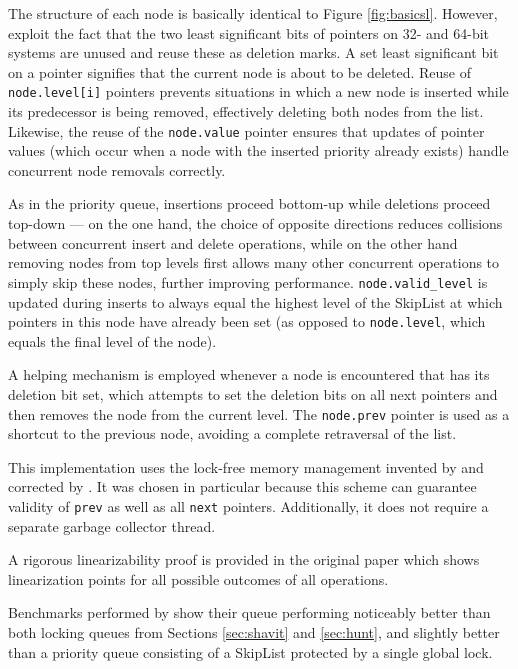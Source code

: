 The structure of each node is basically identical to Figure \ref{fig:basicsl}. However, \citeauthor{sundell2003fast}
exploit the fact that the two least significant bits of pointers on 32- and 64-bit systems
are unused and reuse these as deletion marks. A set least significant bit on a pointer signifies
that the current node is about to be deleted.
Reuse of \lstinline|node.level[i]| pointers
prevents situations in which a new node is inserted while its predecessor is being removed,
effectively deleting both nodes from the list. Likewise, the reuse of the \lstinline|node.value|
pointer ensures that updates of pointer values (which occur when a node with the inserted priority already exists)
handle concurrent node removals correctly.

As in the \citeauthor{shavit2000skiplist} priority queue, insertions proceed bottom-up while
deletions proceed top-down --- on the one hand, the choice of opposite directions reduces collisions
between concurrent insert and delete operations, while on the other hand removing nodes from top levels first
allows many other concurrent operations to simply skip these nodes, further improving performance.
\lstinline|node.valid_level| is updated during inserts to always equal the highest level of the SkipList
at which pointers in this node have already been set (as opposed to \lstinline|node.level|, which equals
the final level of the node).

A helping mechanism is employed whenever a node is encountered that has its deletion bit set, which attempts
to set the deletion bits on all next pointers and then removes the node from the current level. The
\lstinline|node.prev| pointer is used as a shortcut to the previous node, avoiding a complete retraversal
of the list.

This implementation uses the lock-free memory management invented by \citeauthor{valois1996lock}
\cite{valois1995lock,valois1996lock} and corrected by \citeauthor{michael1995correction}
\cite{michael1995correction}. It was chosen in particular because this scheme can guarantee validity
of \lstinline|prev| as well as all \lstinline|next| pointers. Additionally, it does not require a separate
garbage collector thread.

A rigorous linearizability proof is provided in the original paper \cite{sundell2003fast} which shows
linearization points for all possible outcomes of all operations.

Benchmarks performed by \citeauthor{sundell2003fast} show their queue performing noticeably better than both locking
queues from Sections \ref{sec:shavit} and \ref{sec:hunt}, and slightly better than a priority queue
consisting of a SkipList protected by a single global lock.

